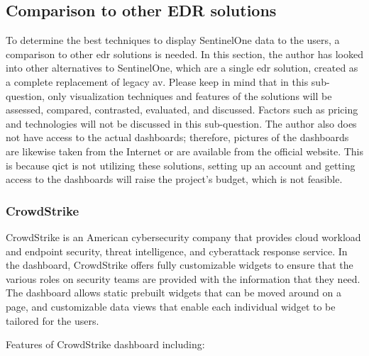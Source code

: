 \subsection{Comparison to other EDR solutions}
To determine the best techniques to display SentinelOne data to the users, a comparison to other \acrshort{edr}
solutions is needed. In this section, the author has looked into other alternatives to SentinelOne, which are
a single \acrshort{edr} solution, created as a complete replacement of legacy \acrshort{av}.
Please keep in mind that in this sub-question, only visualization techniques and features of the solutions
will be assessed, compared, contrasted, evaluated, and discussed. Factors such as pricing and technologies
will not be discussed in this sub-question. The author also does not have access to the actual dashboards;
therefore, pictures of the dashboards are likewise taken from the Internet or are available from the official
website. This is because \acrshort{qict} is not utilizing these solutions, setting up an account and getting
access to the dashboards will raise the project's budget, which is not feasible.

\subsubsection{CrowdStrike}

CrowdStrike is an American cybersecurity company that provides cloud workload and
endpoint security, threat intelligence, and cyberattack response service. In the dashboard, CrowdStrike
offers fully customizable widgets to ensure that the various roles on security teams are provided with
the information that they need. The dashboard allows static prebuilt widgets that can be moved around on
a page, and customizable data views that enable each individual widget to be tailored for the users.

Features of CrowdStrike dashboard including:


